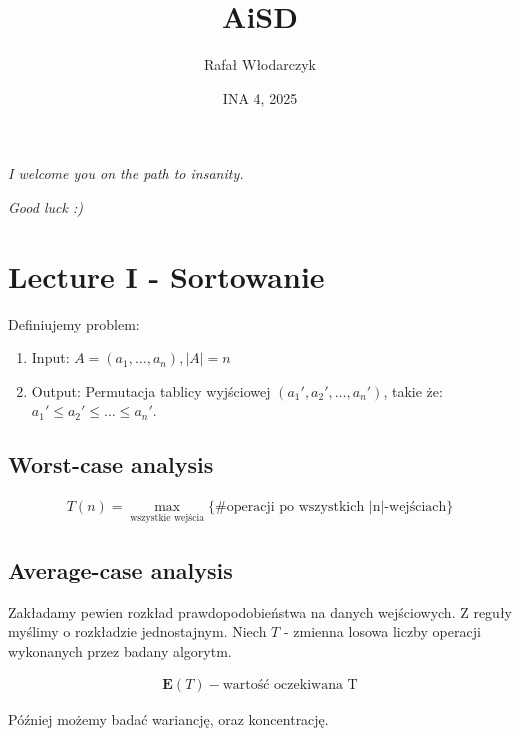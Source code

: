 \documentclass{article}
\title{AiSD}
\author{Rafał Włodarczyk}
\date{INA 4, 2025}
\begin{document}
\maketitle

\tableofcontents

\begin{center}
    \textit{I welcome you on the path to insanity.}
\end{center}

\begin{center}
    \textit{Good luck :)}
\end{center}

\newpage

\section{Lecture I - Sortowanie}

Definiujemy problem:

\begin{enumerate}
    \item Input: $A=(a_1,\dots,a_n), |A|=n$
    \item Output: Permutacja tablicy wyjściowej $(a_1',a_2',\dots,a_n')$, takie że: $a_1'\leq a_2' \leq \dots \leq a_n'$.
\end{enumerate}

\subsection{Worst-case analysis}

\begin{align}
    T(n) = \max_{\text{wszystkie wejścia}}\{\text{\#operacji po wszystkich |n|-wejściach}\}
\end{align}

\subsection{Average-case analysis}

Zakładamy pewien rozkład prawdopodobieństwa na danych wejściowych. Z reguły myślimy o rozkładzie jednostajnym. Niech $T$ - zmienna losowa liczby operacji wykonanych przez badany algorytm.

\begin{align}
    \mathbf{E}(T) - \text{wartość oczekiwana T}
\end{align}

\noindent
Później możemy badać wariancję, oraz koncentrację.
\end{document}
